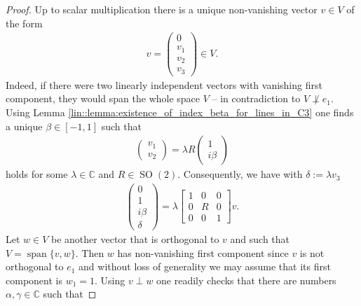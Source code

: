 \documentclass[10pt,a4paper]{amsart}
\newcommand{\C}{\mathbb{C}}
\DeclareMathOperator{\SO}{SO}
\DeclareMathOperator{\spann}{span}
\begin{document}
\begin{proof}
    Up to scalar multiplication there is a unique non-vanishing vector $v \in V$ of the form
    \begin{align*}
        v = \begin{pmatrix}
            0 \\ v_1 \\ v_2 \\ v_3
        \end{pmatrix} \in V.
    \end{align*}
    Indeed, if there were two linearly independent vectors with vanishing first component, they would span the whole space $V$ -- in contradiction to $V \not \perp e_1$. Using Lemma \ref{lin::lemma:existence_of_index_beta_for_lines_in_C3} one finds a unique $\beta \in [-1,1]$ such that
    \begin{align*}
        \begin{pmatrix}
            v_1 \\ v_2
        \end{pmatrix}
        = 
        \lambda R \begin{pmatrix}
                1 \\ i \beta
        \end{pmatrix}
    \end{align*}
    holds for some $\lambda \in \C$ and $R \in \SO(2)$. Consequently, we have with $\delta := \lambda v_3$
    \begin{align*}
        \begin{pmatrix}
                0 \\ 1 \\ i \beta \\ \delta
            \end{pmatrix}
        = 
        \lambda \left[\begin{array}{c|c|c}
            1& 0 & 0 \\
            \hline
            0 & R & 0 \\
            \hline 
            0 & 0 & 1
            \end{array}\right]
            v.
    \end{align*}
    Let $w \in V$ be another vector that is orthogonal to $v$ and such that $V = \spann \{ v, w\}$. Then $w$ has non-vanishing first component since $v$ is not orthogonal to $e_1$ and without loss of generality we may assume that its first component is $w_1 = 1$. Using $v \perp w$ one readily checks that there are numbers $\alpha, \gamma \in \C$ such that

\end{proof}
\end{document}
